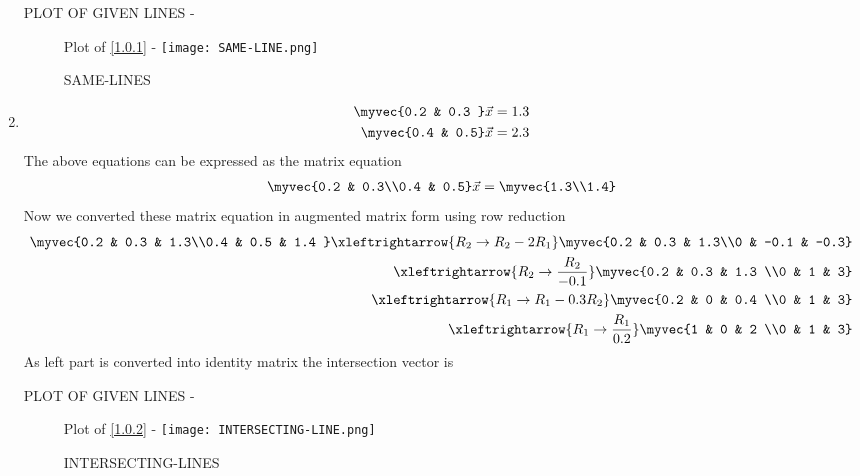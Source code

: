 \documentclass[journal,12pt,twocolumn]{IEEEtran}
\begin{document}
\begin{enumerate}
PLOT OF GIVEN LINES -
\begin{figure}[ht!]
Plot of \eqref{1.0.1} -
\centering
\texttt{[image: SAME-LINE.png]}
\caption{SAME-LINES}
\label{fig:SAME LINES.}
\end{figure} 
\item
\begin{align}
\begin{split}
\myvec{0.2 & 0.3 }\vec{x}&=1.3
\\
\myvec{0.4 & 0.5}\vec{x}&=2.3
\end{split}
\end{align}
The above equations can be expressed as the matrix equation
\begin{align}
\myvec{0.2 & 0.3\\0.4 & 0.5} \vec{x} = \myvec{1.3\\1.4}
\end{align}
%
Now we converted these matrix equation in augmented matrix form using row reduction
\begin{align}
\myvec{0.2 & 0.3 & 1.3\\0.4 & 0.5 & 1.4 } 
\xleftrightarrow {R_2\rightarrow R_2-2R_1}\myvec{0.2 & 0.3 & 1.3\\0 & -0.1 & -0.3} 
\\
\xleftrightarrow {R_2\rightarrow \frac{R_2}{-0.1}}\myvec{0.2 & 0.3 & 1.3 \\0 & 1 & 3}
\\
\xleftrightarrow {R_1\rightarrow R_1-0.3R_2}\myvec{0.2 & 0 & 0.4 \\0 & 1 & 3}
\\
\xleftrightarrow {R_1\rightarrow \frac{R_1}{0.2}}\myvec{1 & 0 & 2 \\0 & 1 & 3}
\end{align}
%
As left part is converted into identity matrix the intersection vector is 

PLOT OF GIVEN LINES -
\begin{figure}[ht!]
Plot of \eqref{1.0.2} -
\centering
\texttt{[image: INTERSECTING-LINE.png]}
\caption{INTERSECTING-LINES}
\label{fig:INTERSECTING LINES.}
\end{figure} 
\end{enumerate}
\end{document}
